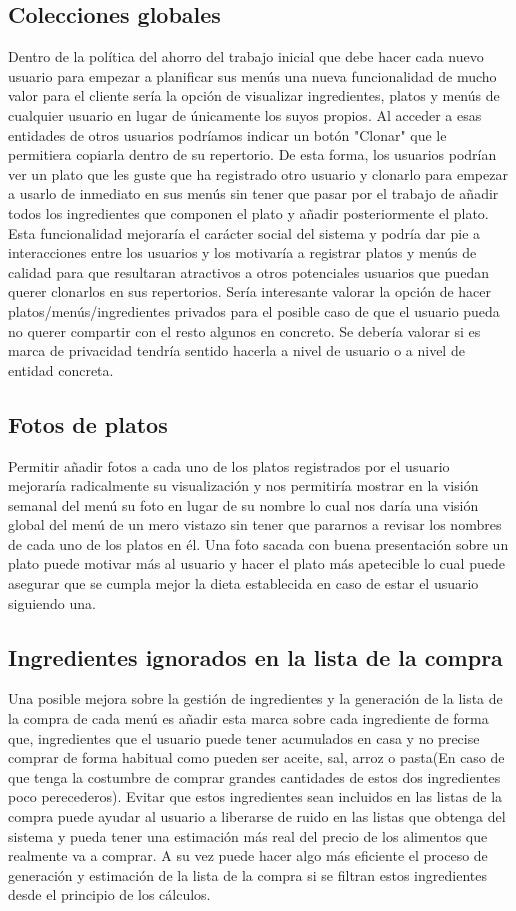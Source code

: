 \documentclass[12pt, a4paper, twoside]{book}
\begin{document}
	\subsection{Colecciones globales}
	Dentro de la política del ahorro del trabajo inicial que debe hacer cada nuevo usuario para empezar a planificar sus menús una nueva funcionalidad de mucho valor para el cliente sería la opción de visualizar ingredientes, platos y menús de cualquier usuario en lugar de únicamente los suyos propios. Al acceder a esas entidades de otros usuarios podríamos indicar un botón "Clonar" que le permitiera copiarla dentro de su repertorio. De esta forma, los usuarios podrían ver un plato que les guste que ha registrado otro usuario y clonarlo para empezar a usarlo de inmediato en sus menús sin tener que pasar por el trabajo de añadir todos los ingredientes que componen el plato y añadir posteriormente el plato.
	Esta funcionalidad mejoraría el carácter social del sistema y podría dar pie a interacciones entre los usuarios y los motivaría a registrar platos y menús de calidad para que resultaran atractivos a otros potenciales usuarios que puedan querer clonarlos en sus repertorios. Sería interesante valorar la opción de hacer platos/menús/ingredientes privados para el posible caso de que el usuario pueda no querer compartir con el resto algunos en concreto. Se debería valorar si es marca de privacidad tendría sentido hacerla a nivel de usuario o a nivel de entidad concreta.
	\subsection{Fotos de platos}
	Permitir añadir fotos a cada uno de los platos registrados por el usuario mejoraría radicalmente su visualización y nos permitiría mostrar en la visión semanal del menú su foto en lugar de su nombre lo cual nos daría una visión global del menú de un mero vistazo sin tener que pararnos a revisar los nombres de cada uno de los platos en él.
	Una foto sacada con buena presentación sobre un plato puede motivar más al usuario y hacer el plato más apetecible lo cual puede asegurar que se cumpla mejor la dieta establecida en caso de estar el usuario siguiendo una.
	\subsection{Ingredientes ignorados en la lista de la compra}
	Una posible mejora sobre la gestión de ingredientes y la generación de la lista de la compra de cada menú es añadir esta marca sobre cada ingrediente de forma que, ingredientes que el usuario puede tener acumulados en casa y no precise comprar de forma habitual como pueden ser aceite, sal, arroz o pasta(En caso de que tenga la costumbre de comprar grandes cantidades de estos dos ingredientes poco perecederos).
	Evitar que estos ingredientes sean incluidos en las listas de la compra puede ayudar al usuario a liberarse de ruido en las listas que obtenga del sistema y pueda tener una estimación más real del precio de los alimentos que realmente va a comprar. A su vez puede hacer algo más eficiente el proceso de generación y estimación de la lista de la compra si se filtran estos ingredientes desde el principio de los cálculos.
	
\end{document}
